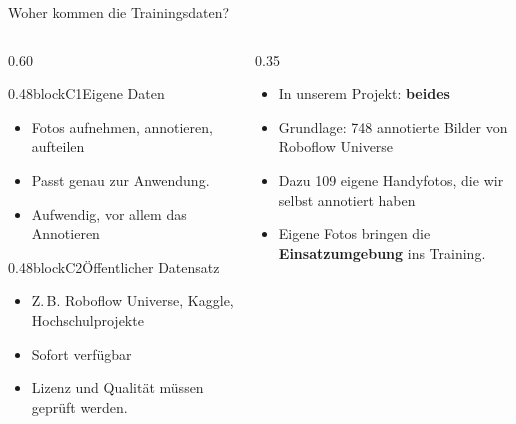 \begin{frame}{Woher kommen die Trainingsdaten?}
\footnotesize
{}
\begin{columns}
\begin{column}{0.60\textwidth}
\begin{blockrow}
  \begin{blockcol}{0.48\linewidth}{blockC1}{Eigene Daten}
    \begin{itemize}
      \item Fotos aufnehmen, annotieren, aufteilen
      \item Passt genau zur Anwendung.
      \item Aufwendig, vor allem das Annotieren
    \end{itemize}
  \end{blockcol}
  \begin{blockcol}{0.48\linewidth}{blockC2}{Öffentlicher Datensatz}
    \begin{itemize}
      \item Z.\,B. Roboflow Universe, Kaggle, Hochschulprojekte
      \item Sofort verfügbar
      \item Lizenz und Qualität müssen geprüft werden.
    \end{itemize}
  \end{blockcol}
\end{blockrow}
\end{column}
\begin{column}{0.35\textwidth}
\begin{itemize}
  \item In unserem Projekt: \textbf{beides}
  \item Grundlage: 748 annotierte Bilder von Roboflow Universe
  \item Dazu 109 eigene Handyfotos, die wir selbst annotiert haben
  \item Eigene Fotos bringen die \textbf{Einsatzumgebung} ins Training.
\end{itemize}
\end{column}
\end{columns}
\end{frame}

